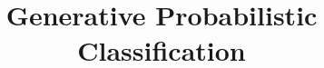 
%

%



%



\title{Generative Probabilistic Classification}

%

\begin{frame}
  \titlepage
\end{frame}


